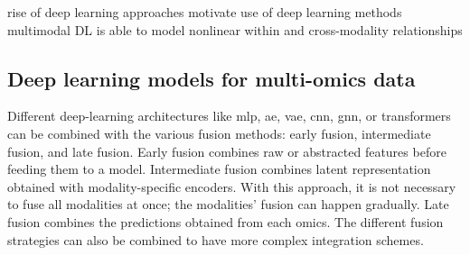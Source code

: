 \documentclass[../main.tex]{subfiles}
\begin{document}
		rise of deep learning approaches
		motivate use of deep learning methods
		multimodal DL is able to model nonlinear within and cross-modality relationships

	\subsection{Deep learning models for multi-omics data}

		Different deep-learning architectures like \gls{mlp}, \gls{ae}, \gls{vae}, \gls{cnn}, \gls{gnn}, or transformers can be combined with the various fusion methods: early fusion, intermediate fusion, and late fusion.
		Early fusion combines raw or abstracted features before feeding them to a model.
		Intermediate fusion combines latent representation obtained with modality-specific encoders.
		With this approach, it is not necessary to fuse all modalities at once; the modalities' fusion can happen gradually.
		Late fusion combines the predictions obtained from each omics.
		The different fusion strategies can also be combined to have more complex integration schemes.
\end{document}

